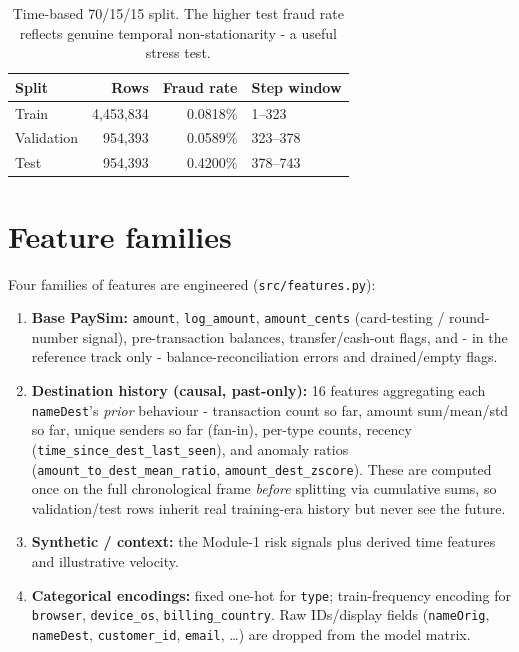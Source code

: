 \documentclass[11pt,a4paper]{report}
\newcommand{\code}[1]{\texttt{\small #1}}
\begin{document}
\begin{table}[h]
\centering
\small
\begin{tabular}{@{}lrrl@{}}
\toprule
\textbf{Split} & \textbf{Rows} & \textbf{Fraud rate} & \textbf{Step window}\\
\midrule
Train & 4{,}453{,}834 & 0.0818\% & 1–323\\
Validation & 954{,}393 & 0.0589\% & 323–378\\
Test & 954{,}393 & 0.4200\% & 378–743\\
\bottomrule
\end{tabular}
\caption{Time-based 70/15/15 split. The higher test fraud rate reflects genuine temporal
non-stationarity - a useful stress test.}
\label{tab:split}
\end{table}

\section{Feature families}

Four families of features are engineered (\code{src/features.py}):

\begin{enumerate}[nosep,leftmargin=1.6em]
  \item \textbf{Base PaySim:} \code{amount}, \code{log\_amount}, \code{amount\_cents}
        (card-testing / round-number signal), pre-transaction balances, transfer/cash-out
        flags, and - in the reference track only - balance-reconciliation errors and
        drained/empty flags.
  \item \textbf{Destination history (causal, past-only):} 16 features aggregating each
        \code{nameDest}'s \emph{prior} behaviour - transaction count so far, amount
        sum/mean/std so far, unique senders so far (fan-in), per-type counts, recency
        (\code{time\_since\_dest\_last\_seen}), and anomaly ratios
        (\code{amount\_to\_dest\_mean\_ratio}, \code{amount\_dest\_zscore}). These are
        computed once on the full chronological frame \emph{before} splitting via cumulative
        sums, so validation/test rows inherit real training-era history but never see the
        future.
  \item \textbf{Synthetic / context:} the Module-1 risk signals plus derived time features
        and illustrative velocity.
  \item \textbf{Categorical encodings:} fixed one-hot for \code{type}; train-frequency
        encoding for \code{browser}, \code{device\_os}, \code{billing\_country}. Raw
        IDs/display fields (\code{nameOrig}, \code{nameDest}, \code{customer\_id},
        \code{email}, \dots) are dropped from the model matrix.
\end{enumerate}
\end{document}
